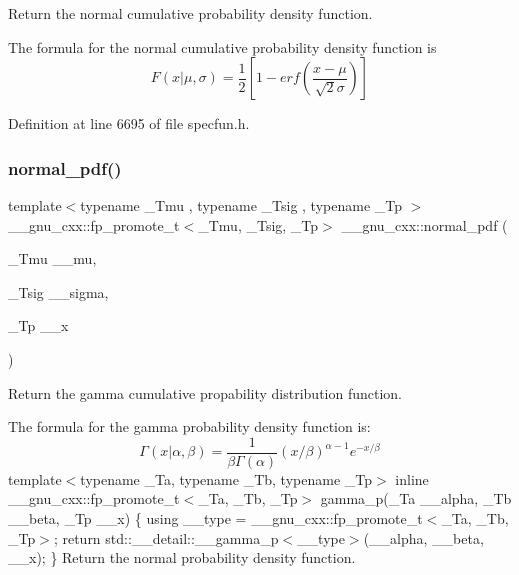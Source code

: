 Return the normal cumulative probability density function. 

The formula for the normal cumulative probability density function is \[ F(x|\mu,\sigma) = \frac{1}{2}\left[ 1-erf(\frac{x-\mu}{\sqrt{2}\sigma}) \right] \] 

Definition at line 6695 of file specfun.\+h.

\mbox{\label{group__mathsf__gnu_gab795379781dea732cbc7556351760401}} 
\subsubsection{\texorpdfstring{normal\+\_\+pdf()}{normal\_pdf()}}
{\footnotesize\ttfamily template$<$typename \+\_\+\+Tmu , typename \+\_\+\+Tsig , typename \+\_\+\+Tp $>$ \\
\+\_\+\+\_\+gnu\+\_\+cxx\+::fp\+\_\+promote\+\_\+t$<$\+\_\+\+Tmu, \+\_\+\+Tsig, \+\_\+\+Tp$>$ \+\_\+\+\_\+gnu\+\_\+cxx\+::normal\+\_\+pdf (\begin{DoxyParamCaption}\item[{\+\_\+\+Tmu}]{\+\_\+\+\_\+mu,  }\item[{\+\_\+\+Tsig}]{\+\_\+\+\_\+sigma,  }\item[{\+\_\+\+Tp}]{\+\_\+\+\_\+x }\end{DoxyParamCaption})\hspace{0.3cm}{\ttfamily [inline]}}



Return the gamma cumulative propability distribution function. 

The formula for the gamma probability density function is\+: \[ \Gamma(x|\alpha,\beta) = \frac{1}{\beta\Gamma(\alpha)} (x/\beta)^{\alpha - 1} e^{-x/\beta} \] template$<$typename \+\_\+\+Ta, typename \+\_\+\+Tb, typename \+\_\+\+Tp$>$ inline \+\_\+\+\_\+gnu\+\_\+cxx\+::fp\+\_\+promote\+\_\+t$<$\+\_\+\+Ta, \+\_\+\+Tb, \+\_\+\+Tp$>$ gamma\+\_\+p(\+\_\+\+Ta \+\_\+\+\_\+alpha, \+\_\+\+Tb \+\_\+\+\_\+beta, \+\_\+\+Tp \+\_\+\+\_\+x) \{ using \+\_\+\+\_\+type = \+\_\+\+\_\+gnu\+\_\+cxx\+::fp\+\_\+promote\+\_\+t$<$\+\_\+\+Ta, \+\_\+\+Tb, \+\_\+\+Tp$>$; return std\+::\+\_\+\+\_\+detail\+::\+\_\+\+\_\+gamma\+\_\+p$<$\+\_\+\+\_\+type$>$(\+\_\+\+\_\+alpha, \+\_\+\+\_\+beta, \+\_\+\+\_\+x); \} Return the normal probability density function.

